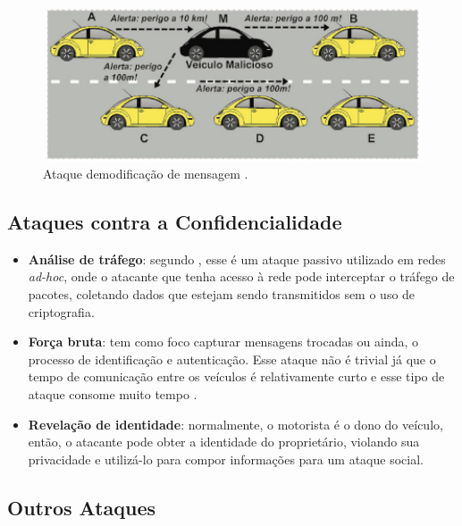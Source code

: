 \documentclass[
	12pt,				%
	oneside,			%
	a4paper,			%
	english,			%
	brazil				%
	]{abntex2ppgsi}
\begin{document}
\begin{itemize}
\begin{figure}[h!]
	\centering
	\includegraphics [width=12cm] {images/ataquemainmiddle.png}
	\caption{Ataque demodificação de mensagem \cite{wanghamsegurancca}.}
	\label{fig:ataquemiddle}
\end{figure}

\end{itemize}

\subsection{Ataques contra a Confidencialidade}

\begin{itemize}

	\item {\textbf{Análise de tráfego}: segundo , esse é um ataque passivo utilizado em redes \textit{ad-hoc}, onde o atacante que tenha acesso à rede pode interceptar o tráfego de pacotes, coletando dados que estejam sendo transmitidos sem o uso de criptografia.}

	\item {\textbf{Força bruta}: tem como foco capturar mensagens trocadas  ou ainda, o processo de identificação e autenticação. Esse ataque não é trivial já que o tempo de comunicação entre os veículos é relativamente curto e esse tipo de ataque consome muito tempo \cite{pathre2013identification}.}

	\item {\textbf{Revelação de identidade}: normalmente, o motorista é o dono do veículo, então, o atacante pode obter a identidade do proprietário,  violando sua privacidade \cite{tangade2013survey} e utilizá-lo para compor informações para um ataque social.}
	
\end{itemize}

\subsection{Outros Ataques}
\end{document}
